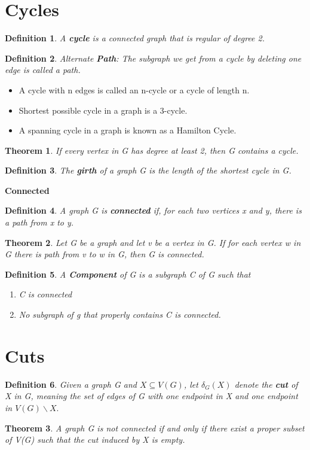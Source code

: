 \documentclass[10pt, a4paper]{article}
\newtheorem*{thm}{Theorem}
\newtheorem*{defn}{Definition}
\begin{document}
\section{Cycles}
\begin{defn}
    A \textbf{cycle} is a connected graph that is regular of degree 2.
\end{defn}
\begin{defn}
    Alternate \textbf{Path}: The subgraph we get from a cycle by deleting one edge is called a path.
\end{defn}
\begin{term}
    \begin{itemize}
        \item A cycle with n edges is called an n-cycle or a cycle of length n.
        \item Shortest possible cycle in a graph is a 3-cycle.
        \item A spanning cycle in a graph is known as a Hamilton Cycle.
    \end{itemize}
\end{term}
\begin{thm}
    If every vertex in G has degree at least 2, then G contains a cycle.
\end{thm}
\begin{defn}
    The \textbf{girth} of a graph G is the length of the shortest cycle in G.
\end{defn}
\textbf{Connected}
\begin{defn}
    A graph G is \textbf{connected} if, for each two vertices x and y, there is a path from x to y.
\end{defn}
\begin{thm}
    Let G be a graph and let v be a vertex in G. If for each vertex w in G there is path from v to w in G, then G is connected.
\end{thm}
\begin{defn}
    A \textbf{Component} of G is a subgraph C of G such that
    \begin{enumerate}
        \item C is connected
        \item No subgraph of g that properly contains C is connected.
    \end{enumerate}
\end{defn}
\section{Cuts}
\begin{defn}
    Given a graph G and $X \subseteq V(G)$, let $\delta_G(X)$ denote the \textbf{cut} of X in G, meaning the set of edges of G with one endpoint in X and one endpoint in $V(G) \backslash X.$
\end{defn}
\begin{thm}
    A graph G is not connected if and only if there exist a proper subset of V(G) such that the cut induced by X is empty.
\end{thm}
\end{document}
